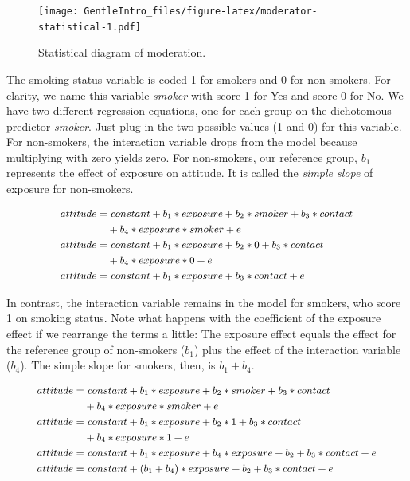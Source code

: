 \documentclass[a4paper]{book}
\theoremstyle{definition}
\theoremstyle{definition}
\theoremstyle{definition}
\theoremstyle{remark}
\begin{document}
\begin{figure}[H]
\centering
\texttt{[image: GentleIntro\_files/figure-latex/moderator-statistical-1.pdf]}
\caption{\label{fig:moderator-statistical}Statistical diagram of
moderation.}
\end{figure}

The smoking status variable is coded 1 for smokers and 0 for
non-smokers. For clarity, we name this variable \emph{smoker} with score
1 for Yes and score 0 for No. We have two different regression
equations, one for each group on the dichotomous predictor
\emph{smoker}. Just plug in the two possible values (1 and 0) for this
variable. For non-smokers, the interaction variable drops from the model
because multiplying with zero yields zero. For non-smokers, our
reference group, \(b_1\) represents the effect of exposure on attitude.
It is called the \emph{simple slope} of exposure for non-smokers.

\begin{equation}
\small
\begin{split}
  attitude = &\ constant + b_1*exposure + b_2*smoker + b_3*contact\\
    &+ b_4*exposure*smoker + e \\
  attitude = &\ constant + b_1*exposure + b_2*0 + b_3*contact\\
    &+ b_4*exposure*0 + e \\
  attitude = &\ constant + b_1*exposure + b_3*contact + e
\end{split}
\label{eq:intvarnonsmoker} 
\normalsize
\end{equation}

In contrast, the interaction variable remains in the model for smokers,
who score 1 on smoking status. Note what happens with the coefficient of
the exposure effect if we rearrange the terms a little: The exposure
effect equals the effect for the reference group of non-smokers
(\(b_1\)) plus the effect of the interaction variable (\(b_4\)). The
simple slope for smokers, then, is \(b_1 + b_4\).

\begin{equation}
\small
\begin{split}
  attitude = &\ constant + b_1*exposure + b_2*smoker + b_3*contact\\
  &+ b_4*exposure*smoker + e \\
  attitude = &\ constant + b_1*exposure + b_2*1 + b_3*contact\\
  &+ b_4*exposure*1 + e \\
  attitude = &\ constant + b_1*exposure + b_4*exposure + b_2 + b_3*contact + e \\
  attitude = &\ constant + (b_1 + b_4)*exposure + b_2 + b_3*contact + e 
\end{split}
\label{eq:intvarsmoker} 
\normalsize
\end{equation}
\end{document}
